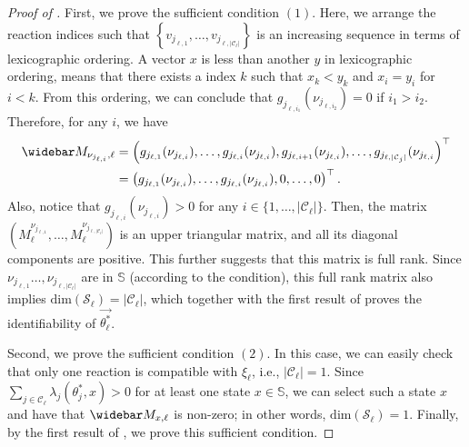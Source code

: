 \documentclass[pdflatex,sn-mathphys-num]{sn-jnl}%
\theoremstyle{thmstyleone}%
\theoremstyle{thmstyletwo}%
\theoremstyle{thmstylethree}%
\begin{document}
\begin{appendices}
\begin{proof}[Proof of ]
    First, we prove the sufficient condition $(1)$.
    Here, we arrange the reaction indices such that $\left\{v_{j_{\ell, 1}}, \dots, v_{j_{\ell, |\mathcal C_\ell|}}\right\}$
    is an increasing sequence in terms of lexicographic ordering. 
    A vector $x$ is less than another $y$ in lexicographic ordering, means that there exists a index $k$ such that $x_k< y_k$ and $x_i = y_i$ for $i<k$.
    From this ordering, we can conclude that $g_{j_{\ell, i_1}} (\nu_{j_{\ell, i_2}}) = 0$ if $i_1>i_2$. 
    Therefore, for any $i$, we have
    \begin{align*}
            \widebar M_{\nu_{j_{\ell, i}},\ell} 
            &= \left(g_{j_{\ell, 1}} (\nu_{j_{\ell, i}}), \dots, g_{j_{\ell, i}} (\nu_{j_{\ell, i}}), g_{j_{\ell, i+1}} (\nu_{j_{\ell, i}}),  \dots,
            g_{j_{\ell, |\mathcal C_j|}} (\nu_{j_{\ell, i}}
            \right)^{\top} \\
            &= \left(g_{j_{\ell, 1}} (\nu_{j_{\ell, i}}), \dots, g_{j_{\ell, i}} (\nu_{j_{\ell, i}}), 0, \dots, 
            0
            \right)^{\top}.
    \end{align*}
    Also, notice that $g_{j_{\ell, i}} (\nu_{j_{\ell, i}}) > 0$ for any $i\in\{1,\dots, | \mathcal C_\ell|\}$.
    Then, the matrix $\left(M^{\nu_{j_{\ell, 1}}}_{\ell}, \dots, M^{\nu_{j_{\ell, | \mathcal C_\ell|}}}_{\ell}
    \right)$
    is an upper triangular matrix, and all its diagonal components are positive.
    This further suggests that this matrix is full rank. 
    Since $\nu_{j_{\ell, 1}} \dots,\nu_{j_{\ell, | \mathcal C_\ell|}} $ are in $\mathbb S$ (according to the condition), this full rank matrix also implies $\text{dim}(\mathcal S_\ell) = | \mathcal C_\ell| $, which together with the first result of  proves the identifiability of 
    $\overrightarrow {\theta^*_\ell}$.

    Second, we prove the sufficient condition $(2)$. In this case, we can easily check that only one reaction is compatible with $\xi_\ell$, i.e., $|\mathcal C_\ell| =1$.
    Since $\sum_{j\in\mathcal C_\ell}\lambda_{j}(\theta^*_j,x) > 0$ for at least one state $x\in \mathbb S$, we can select such a state $x$ and have that $\widebar M_{x,\ell} $ is non-zero; in other words, $\text{dim}(\mathcal S_\ell) = 1$.
    Finally, by the first result of , we prove this sufficient condition. 
\end{proof}


\end{appendices}
\end{document}
